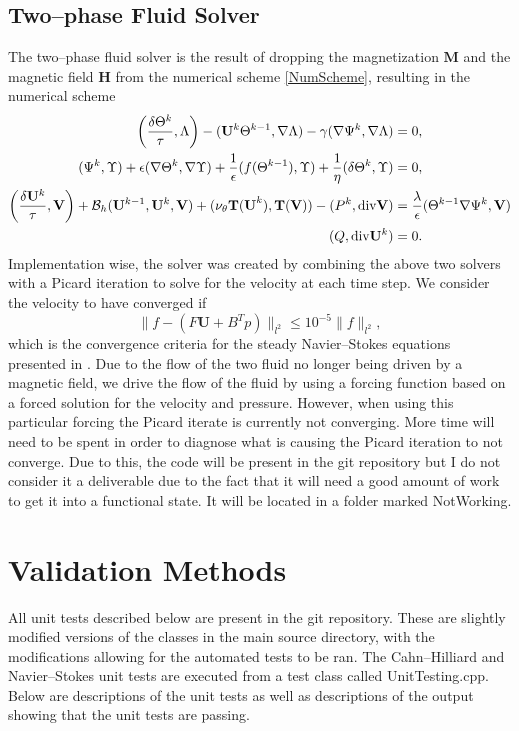 \documentclass[11pt,fullpage]{article}
\newcommand{\norm}[1]{\|#1\|}
\newcommand{\eps}{\epsilon}
\newcommand{\grad}{\nabla}
\newcommand{\diver}{\textup{div} }
\theoremstyle{lemma}
\theoremstyle{definition}
\theoremstyle{lemma}
\begin{document}
\subsection{Two--phase Fluid Solver}
The two--phase fluid solver is the result of dropping the magnetization $\mathbf{M}$ and the magnetic field $\mathbf{H}$ from the numerical scheme \ref{NumScheme}, resulting in the numerical scheme
\begin{align*}
\bigg(\frac{\delta\Theta^k}{\tau}, \Lambda\bigg) - (\mathbf{U}^k\Theta^{k-1}, \grad\Lambda) - \gamma(\grad \Psi^k, \grad \Lambda)&=0,\\
(\Psi^k, \Upsilon) + \eps(\grad \Theta^k, \grad \Upsilon) + \frac{1}{\eps}(f(\Theta^{k-1}), \Upsilon) + \frac{1}{\eta}(\delta\Theta^k, \Upsilon) &= 0,\\
\bigg(\frac{\delta\mathbf{U}^k}{\tau}, \mathbf{V}\bigg) + \mathcal{B}_h(\mathbf{U}^{k-1}, \mathbf{U}^k, \mathbf{V}) + (\nu_\theta\mathbf{T(U}^k), \mathbf{T(V)}) - (P^k, \diver \mathbf{V}) &= \frac{\lambda}{\eps}(\Theta^{k-1}\grad \Psi^k, \mathbf{V})\\
(Q, \diver\mathbf{U}^k) &= 0.
\end{align*}
Implementation wise, the solver was created by combining the above two solvers with a Picard iteration to solve for the velocity at each time step. We consider the velocity to have converged if 
$$
	\norm{f - (F\mathbf{U} + B^T p)}_{l^2} \leq 10^{-5}\norm{f}_{l^2},
$$
which is the convergence criteria for the steady Navier--Stokes equations presented in \cite{Elman2}. Due to the flow of the two fluid no longer being driven by a magnetic field, we drive the flow of the fluid by using a forcing function based on a forced solution for the velocity and pressure. However, when using this particular forcing the Picard iterate is currently not converging. More time will need to be spent in order to diagnose what is causing the Picard iteration to not converge. Due to this, the code will be present in the git repository but I do not consider it a deliverable due to the fact that it will need a good amount of work to get it into a functional state. It will be located in a folder marked NotWorking.


\section{Validation Methods}
All unit tests described below are present in the git repository. These are slightly modified versions of the classes in the main source directory, with the modifications allowing for the automated tests to be ran. The Cahn--Hilliard and Navier--Stokes unit tests are executed from a test class called UnitTesting.cpp. Below are descriptions of the unit tests as well as descriptions of the output showing that the unit tests are passing.
\end{document}
